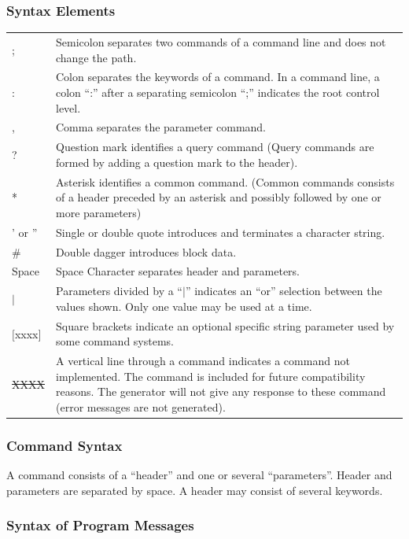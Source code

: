 \subsubsection{Syntax Elements}

\begin{tabular*}{\textwidth}{@{\extracolsep{\fill}}|l|p{42em}|}
\hline
; 		& Semicolon separates two commands of a command line and does not change the path.\\
: 		& Colon separates the keywords of a command. In a command line, a colon ``:'' after a separating semicolon ``;'' indicates the root control level.\\
, 		& Comma separates the parameter command.\\
? 		& Question mark identifies a query command (Query commands are formed by adding a question mark to the header).\\
* 		& Asterisk identifies a common command. (Common commands consists of a header preceded by an asterisk and possibly followed by one or more parameters)\\
' or '' & Single or double quote introduces and terminates a character string.\\
\# 		& Double dagger introduces block data. \\
Space & Space Character separates header and parameters.\\
$|$		& Parameters divided by a ``$|$'' indicates an ``or'' selection between the values shown. Only one value may be used at a time.\\
$[$xxxx$]$ & Square brackets indicate an optional specific string parameter used by some command systems.\\
\sout{XXXX} 	& A vertical line through a command indicates a command not implemented. The command is included for future compatibility
reasons. The generator will not give any response to these command (error messages are not generated).\\
\hline
\end{tabular*}

\subsubsection{Command Syntax}

A command consists of a ``header'' and one or several ``parameters''. Header and parameters are separated by space. A header may consist of several keywords.

\subsubsection{Syntax of Program Messages}

